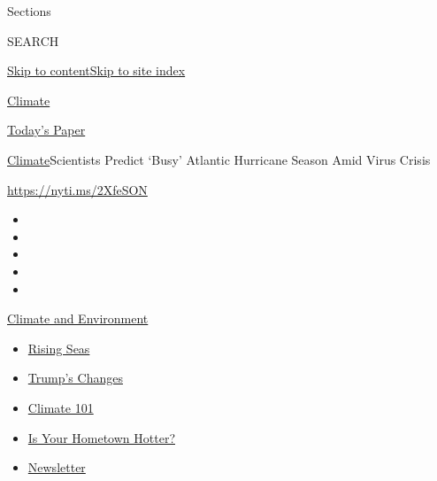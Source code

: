 Sections

SEARCH

\protect\hyperlink{site-content}{Skip to
content}\protect\hyperlink{site-index}{Skip to site index}

\href{https://www.nytimes.com/section/climate}{Climate}

\href{https://myaccount.nytimes.com/auth/login?response_type=cookie\&client_id=vi}{}

\href{https://www.nytimes.com/section/todayspaper}{Today's Paper}

\href{/section/climate}{Climate}\textbar{}Scientists Predict `Busy'
Atlantic Hurricane Season Amid Virus Crisis

\url{https://nyti.ms/2XfeSON}

\begin{itemize}
\item
\item
\item
\item
\item
\end{itemize}

\href{https://www.nytimes.com/section/climate?action=click\&pgtype=Article\&state=default\&region=TOP_BANNER\&context=storylines_menu}{Climate
and Environment}

\begin{itemize}
\tightlist
\item
  \href{https://www.nytimes.com/2020/07/30/climate/sea-level-inland-floods.html?action=click\&pgtype=Article\&state=default\&region=TOP_BANNER\&context=storylines_menu}{Rising
  Seas}
\item
  \href{https://www.nytimes.com/interactive/2020/climate/trump-environment-rollbacks.html?action=click\&pgtype=Article\&state=default\&region=TOP_BANNER\&context=storylines_menu}{Trump's
  Changes}
\item
  \href{https://www.nytimes.com/interactive/2020/04/19/climate/climate-crash-course-1.html?action=click\&pgtype=Article\&state=default\&region=TOP_BANNER\&context=storylines_menu}{Climate
  101}
\item
  \href{https://www.nytimes.com/interactive/2018/08/30/climate/how-much-hotter-is-your-hometown.html?action=click\&pgtype=Article\&state=default\&region=TOP_BANNER\&context=storylines_menu}{Is
  Your Hometown Hotter?}
\item
  \href{https://www.nytimes.com/newsletters/climate-change?action=click\&pgtype=Article\&state=default\&region=TOP_BANNER\&context=storylines_menu}{Newsletter}
\end{itemize}

